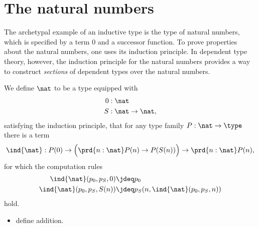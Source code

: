 \section{The natural numbers}
The archetypal example of an inductive type is the type of natural numbers, which is specified by a term $0$ and a successor function. To prove properties about the natural numbers, one uses its induction principle. In dependent type theory, however, the induction principle for the natural numbers provides a way to construct \emph{sections} of dependent types over the natural numbers. 

\begin{defn}
We define $\nat$ to be a type equipped with
\begin{align*}
0 & : \nat \\
S & : \nat \to\nat,
\end{align*}
satisfying the induction principle, that for any type family $P:\nat\to\type$ there is a term
\begin{equation*}
\ind{\nat}:P(0)\to \Big(\prd{n:\nat}P(n)\to P(S(n))\Big)\to \prd{n:\nat}P(n),
\end{equation*}
for which the computation rules
\begin{align*}
\ind{\nat}(p_0,p_S,0) & \jdeq p_0 \\
\ind{\nat}(p_0,p_S,S(n)) & \jdeq p_S(n,\ind{\nat}(p_0,p_S,n))
\end{align*}
hold.
\end{defn}

\begin{itemize}
\item define addition.
\end{itemize}


